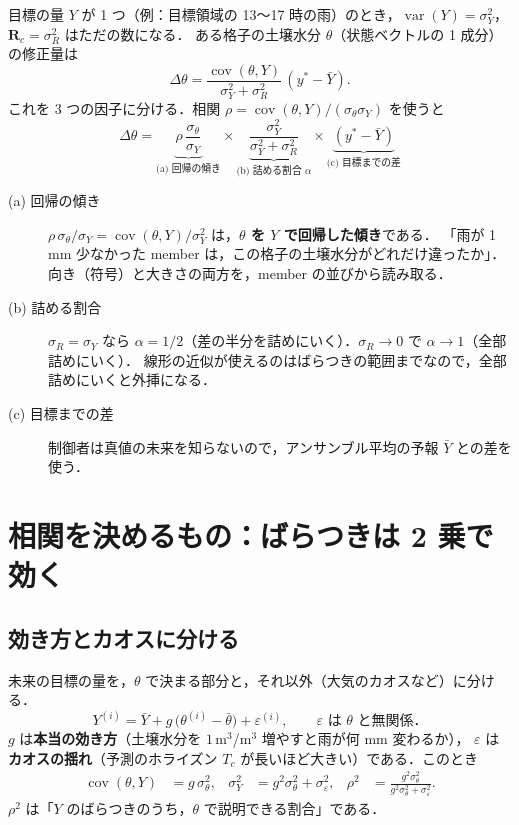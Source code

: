 \documentclass[dvipdfmx,a4paper,10.5pt]{jarticle}
\numberwithin{equation}{section}
\newcommand{\cov}{\operatorname{cov}}
\newcommand{\Var}{\operatorname{var}}
\begin{document}
目標の量 $Y$ が 1 つ（例：目標領域の 13〜17 時の雨）のとき，$\Var(Y)=\sigma_Y^2$，$\mathbf R_c=\sigma_R^2$ はただの数になる．
ある格子の土壌水分 $\theta$（状態ベクトルの 1 成分）の修正量は
\begin{equation}
  \Delta\theta = \frac{\cov(\theta,Y)}{\sigma_Y^2+\sigma_R^2}\,(y^*-\bar Y).
  \label{eq:scalar}
\end{equation}
これを 3 つの因子に分ける．相関 $\rho = \cov(\theta,Y)/(\sigma_\theta\sigma_Y)$ を使うと
\begin{equation}
  \boxed{\;
  \Delta\theta
  = \underbrace{\rho\,\frac{\sigma_\theta}{\sigma_Y}}_{\text{(a) 回帰の傾き}}
    \times\underbrace{\frac{\sigma_Y^2}{\sigma_Y^2+\sigma_R^2}}_{\text{(b) 詰める割合 }\alpha}
    \times\underbrace{(y^*-\bar Y)}_{\text{(c) 目標までの差}}
  \;}
  \label{eq:three}
\end{equation}

\begin{description}
  \item[(a) 回帰の傾き] $\rho\,\sigma_\theta/\sigma_Y = \cov(\theta,Y)/\sigma_Y^2$ は，\textbf{$\theta$ を $Y$ で回帰した傾き}である．
        「雨が 1\,mm 少なかった member は，この格子の土壌水分がどれだけ違ったか」．
        向き（符号）と大きさの両方を，member の並びから読み取る．
  \item[(b) 詰める割合] $\sigma_R=\sigma_Y$ なら $\alpha=1/2$（差の半分を詰めにいく）．$\sigma_R\to0$ で $\alpha\to1$（全部詰めにいく）．
        線形の近似が使えるのはばらつきの範囲までなので，全部詰めにいくと外挿になる．
  \item[(c) 目標までの差] 制御者は真値の未来を知らないので，アンサンブル平均の予報 $\bar Y$ との差を使う．
\end{description}

\section{相関を決めるもの：ばらつきは 2 乗で効く}\label{sec:decomp}

\subsection{効き方とカオスに分ける}
未来の目標の量を，$\theta$ で決まる部分と，それ以外（大気のカオスなど）に分ける．
\begin{equation}
  Y^{(i)} = \bar Y + g\,\bigl(\theta^{(i)}-\bar\theta\bigr) + \varepsilon^{(i)},
  \qquad \varepsilon \text{ は } \theta \text{ と無関係．}
  \label{eq:model}
\end{equation}
$g$ は\textbf{本当の効き方}（土壌水分を $1$\,m$^3$/m$^3$ 増やすと雨が何 mm 変わるか），
$\varepsilon$ は\textbf{カオスの揺れ}（予測のホライズン $T_c$ が長いほど大きい）である．このとき
\begin{align}
  \cov(\theta,Y) &= g\,\sigma_\theta^2, &
  \sigma_Y^2 &= g^2\sigma_\theta^2+\sigma_\varepsilon^2, &
  \rho^2 &= \frac{g^2\sigma_\theta^2}{g^2\sigma_\theta^2+\sigma_\varepsilon^2}.
  \label{eq:rho}
\end{align}
$\rho^2$ は「$Y$ のばらつきのうち，$\theta$ で説明できる割合」である．
\end{document}
